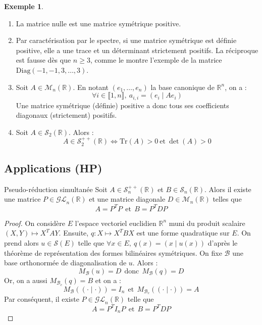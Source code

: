 \documentclass[french]{article}
\newcommand{\R}{\mathbb{R}}
\newcommand{\Tr}{\text{Tr}}
\theoremstyle{plain}
\theoremstyle{definition}
\newtheorem*{ex}{Exemple}
\theoremstyle{remark}
\begin{document}
\begin{ex}
	\begin{enumerate}
		\item La matrice nulle est une matrice symétrique positive.
		\item Par caractérisation par le spectre, si une matrice symétrique est définie positive, elle a une trace et un déterminant strictement positifs. La réciproque est fausse dès que $n\geqslant 3$, comme le montre l'exemple de la matrice $\text{Diag}(-1,-1,3,\ldots,3)$.
		\item Soit $A\in\mathcal{M}_n(\R)$. En notant $(e_1,\ldots,e_n)$ la base canonique de $\R^n$, on a : $$\forall i\in\llbracket1,n\rrbracket,\ a_{i,i}=(e_i\mid Ae_i)$$ Une matrice symétrique (définie) positive a donc tous ses coefficients diagonaux (strictement) positifs.
		\item Soit $A\in\mathcal{S}_2(\R)$. Alors : $$A\in\mathcal{S}_2^{++}(\R)\iff \Tr(A)>0\ \text{et}\ \det(A)>0$$
	\end{enumerate}
\end{ex}

\subsection{Applications (HP)}

\begin{thm}{Pseudo-réduction simultanée}
	Soit $A\in\mathcal{S}_n^{++}(\R)$ et $B\in\mathcal{S}_n(\R)$. Alors il existe une matrice $P\in\mathcal{GL}_n(\R)$ et une matrice diagonale $D\in\mathcal{M}_n(\R)$ telles que $$A=P^TP\ \ \text{et}\ \ B=P^TDP$$
\end{thm}

\begin{proof}
	On considère $E$ l'espace vectoriel euclidien $\R^n$ muni du produit scalaire $(X,Y)\mapsto X^TAY$. Ensuite, $q:X\mapsto X^TBX$ est une forme quadratique sur $E$. On prend alors $u\in\mathcal{S}(E)$ telle que $\forall x\in E,\ q(x)=(x\mid u(x))$ d'après le théorème de représentation des formes bilinéaires symétriques. On fixe $\mathcal{B}$ une base orthonormée de diagonalisation de $u$. Alors : $$M_\mathcal{B}(u)=D\ \ \text{donc} \ \ M_\mathcal{B}(q)=D$$ Or, on a aussi $M_{\mathcal{B}_c}(q)=B$ et on a : $$M_\mathcal{B}((\cdot\mid\cdot))=I_n \ \ \text{et} \ \ M_{\mathcal{B}_c}((\cdot\mid\cdot))=A$$ Par conséquent, il existe $P\in\mathcal{GL}_n(\R)$ telle que $$A=P^TI_nP\ \ \text{et}\ \ B=P^TDP$$
\end{proof}
\end{document}
